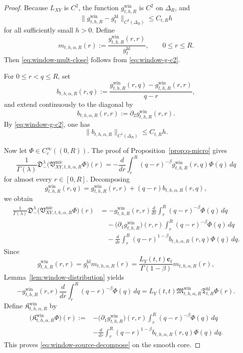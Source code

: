 \documentclass[11pt,a4paper]{amsart}
\theoremstyle{plain}
\theoremstyle{definition}
\theoremstyle{remark}
\begin{document}
\begin{proof}
Because \(L_{XY}\) is \(C^2\), the function \(g_{t,h,R}^{\mathrm{win}}\) is \(C^2\) on
\(\Delta_R\), and
\begin{equation}\label{eq:window-g-c2}
\|g_{t,h,R}^{\mathrm{win}}-g_t^{\mathrm{hl}}\|_{C^2(\Delta_R)}
\le
C_{t,R}h
\end{equation}
for all sufficiently small \(h>0\). Define
\[
m_{t,h,\alpha,R}(r):=
\frac{g_{t,h,R}^{\mathrm{win}}(r,r)}{g_t^{\mathrm{hl}}},
\qquad 0\le r\le R.
\]
Then \eqref{eq:window-mult-close} follows from \eqref{eq:window-g-c2}.

For \(0\le r<q\le R\), set
\[
b_{t,h,\alpha,R}(r,q)
:=
\frac{g_{t,h,R}^{\mathrm{win}}(r,q)-g_{t,h,R}^{\mathrm{win}}(r,r)}{q-r},
\]
and extend continuously to the diagonal by
\[
b_{t,h,\alpha,R}(r,r):=\partial_2 g_{t,h,R}^{\mathrm{win}}(r,r).
\]
By \eqref{eq:window-g-c2}, one has
\begin{equation}\label{eq:b-window}
\|b_{t,h,\alpha,R}\|_{C^1(\Delta_R)}\le C_{t,R}h.
\end{equation}

Now let \(\Phi\in C_c^\infty((0,R))\). The proof of Proposition~\ref{prop:q-micro} gives
\[
\frac{1}{\Gamma(\lambda)}
\mathfrak D_-^\lambda
\bigl(
\mathfrak V_{XY,t,h,\alpha,R}^{\mathrm{mic}}\Phi
\bigr)(r)
=
-\frac{d}{dr}
\int_r^R
(q-r)^{-\beta}
g_{t,h,R}^{\mathrm{win}}(r,q)\Phi(q)\,dq
\]
for almost every \(r\in[0,R]\). Decomposing
\[
g_{t,h,R}^{\mathrm{win}}(r,q)
=
g_{t,h,R}^{\mathrm{win}}(r,r)
+
(q-r)b_{t,h,\alpha,R}(r,q),
\]
we obtain
\begin{align*}
\frac{1}{\Gamma(\lambda)}
\mathfrak D_-^\lambda
\bigl(
\mathfrak V_{XY,t,h,\alpha,R}^{\mathrm{mic}}\Phi
\bigr)(r)
&=
-g_{t,h,R}^{\mathrm{win}}(r,r)\frac{d}{dr}
\int_r^R (q-r)^{-\beta}\Phi(q)\,dq \\
&\quad
-\bigl(\partial_1 g_{t,h,R}^{\mathrm{win}}\bigr)(r,r)
\int_r^R (q-r)^{-\beta}\Phi(q)\,dq \\
&\quad
-\frac{d}{dr}
\int_r^R (q-r)^{1-\beta}
b_{t,h,\alpha,R}(r,q)\Phi(q)\,dq.
\end{align*}
Since
\[
g_{t,h,R}^{\mathrm{win}}(r,r)
=
g_t^{\mathrm{hl}}m_{t,h,\alpha,R}(r)
=
\frac{L_Y(t,t)\mathbf c_t}{\Gamma(1-\beta)}m_{t,h,\alpha,R}(r),
\]
Lemma~\ref{lem:window-distribution} yields
\[
-g_{t,h,R}^{\mathrm{win}}(r,r)\frac{d}{dr}
\int_r^R (q-r)^{-\beta}\Phi(q)\,dq
=
L_Y(t,t)\mathfrak M_{t,h,\alpha,R}^{\mathrm{win}}
\mathfrak T_{t,R}^{\mathrm{hl}}\Phi(r).
\]
Define \(\mathfrak K_{t,h,\alpha,R}^{\mathrm{win}}\) by
\begin{align*}
\bigl(
\mathfrak K_{t,h,\alpha,R}^{\mathrm{win}}\Phi
\bigr)(r)
:={}&
-\bigl(\partial_1 g_{t,h,R}^{\mathrm{win}}\bigr)(r,r)
\int_r^R (q-r)^{-\beta}\Phi(q)\,dq \\
&-
\frac{d}{dr}
\int_r^R (q-r)^{1-\beta}
b_{t,h,\alpha,R}(r,q)\Phi(q)\,dq.
\end{align*}
This proves \eqref{eq:window-source-decompose} on the smooth core.


\end{proof}
\end{document}
